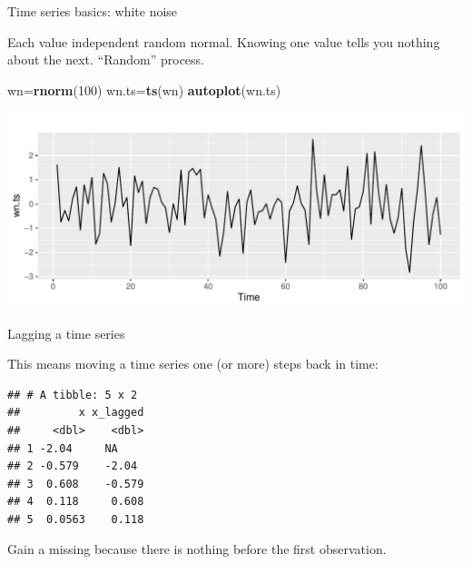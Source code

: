 \documentclass[ignorenonframetext,]{beamer}
\newenvironment{Shaded}{\begin{snugshade}}{\end{snugshade}}
\newcommand{\DataTypeTok}[1]{\textcolor[rgb]{0.13,0.29,0.53}{#1}}
\newcommand{\DecValTok}[1]{\textcolor[rgb]{0.00,0.00,0.81}{#1}}
\newcommand{\KeywordTok}[1]{\textcolor[rgb]{0.13,0.29,0.53}{\textbf{#1}}}
\newcommand{\NormalTok}[1]{#1}
\newcommand{\OperatorTok}[1]{\textcolor[rgb]{0.81,0.36,0.00}{\textbf{#1}}}
\newcommand{\StringTok}[1]{\textcolor[rgb]{0.31,0.60,0.02}{#1}}
\begin{document}
\begin{frame}[fragile]{Time series basics: white noise}
\protect\hypertarget{time-series-basics-white-noise}{}

Each value independent random normal. Knowing one value tells you
nothing about the next. ``Random'' process.

\begin{Shaded}
\begin{Highlighting}[]
\NormalTok{wn=}\KeywordTok{rnorm}\NormalTok{(}\DecValTok{100}\NormalTok{)}
\NormalTok{wn.ts=}\KeywordTok{ts}\NormalTok{(wn)}
\KeywordTok{autoplot}\NormalTok{(wn.ts)}
\end{Highlighting}
\end{Shaded}

\includegraphics{figure/White-Noise-1.pdf}

\end{frame}

\begin{frame}[fragile]{Lagging a time series}
\protect\hypertarget{lagging-a-time-series}{}

This means moving a time series one (or more) steps back in time:

\begin{Shaded}
\end{Shaded}

\begin{verbatim}
## # A tibble: 5 x 2
##         x x_lagged
##     <dbl>    <dbl>
## 1 -2.04     NA    
## 2 -0.579    -2.04 
## 3  0.608    -0.579
## 4  0.118     0.608
## 5  0.0563    0.118
\end{verbatim}

Gain a missing because there is nothing before the first observation.

\end{frame}
\end{document}

